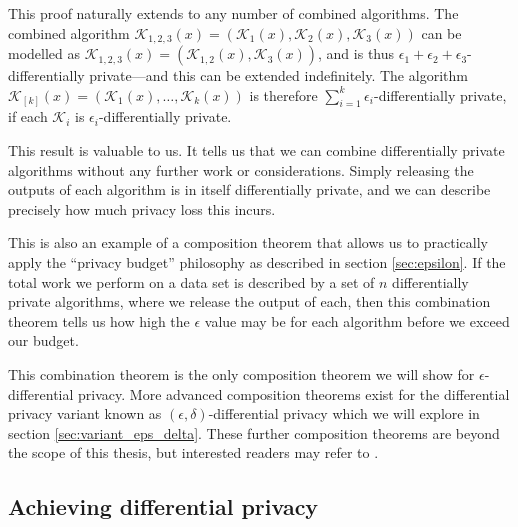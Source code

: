 \documentclass[12pt]{article}
\newcommand{\fancy}{\mathcal}
\begin{document}
This proof naturally extends to any number of combined algorithms. The combined algorithm $\fancy{K}_{1,2,3}(x)=\left(\fancy{K}_1(x), \fancy{K}_2(x), \fancy{K}_3(x) \right)$ can be modelled as $\fancy{K}_{1,2,3}(x)=\left(\fancy{K}_{1,2}(x), \fancy{K}_3(x)\right)$, and is thus $\epsilon_1 + \epsilon_2 + \epsilon_3$-differentially private---and this can be extended indefinitely. The algorithm $\fancy{K}_{[k]}(x)=\left(\fancy{K}_1(x), \dots, \fancy{K}_k(x) \right)$ is therefore $\sum_{i=1}^k \epsilon_i$-differentially private, if each $\fancy{K}_i$ is $\epsilon_i$-differentially private. \bigskip

This result is valuable to us. It tells us that we can combine differentially private algorithms without any further work or considerations. Simply releasing the outputs of each algorithm is in itself differentially private, and we can describe precisely how much privacy loss this incurs.

This is also an example of a composition theorem that allows us to practically apply the ``privacy budget'' philosophy as described in section \ref{sec:epsilon}. If the total work we perform on a data set is described by a set of $n$ differentially private algorithms, where we release the output of each, then this combination theorem tells us how high the $\epsilon$ value may be for each algorithm before we exceed our budget. \bigskip

This combination theorem is the only composition theorem we will show for $\epsilon$-differential privacy. More advanced composition theorems exist for the differential privacy variant known as $(\epsilon,\delta)$-differential privacy which we will explore in section \ref{sec:variant_eps_delta}. These further composition theorems are beyond the scope of this thesis, but interested readers may refer to \cite[ch.~3]{dwork_privacybook}.

\subsection{Achieving differential privacy \label{sec:achieving}}
\end{document}
